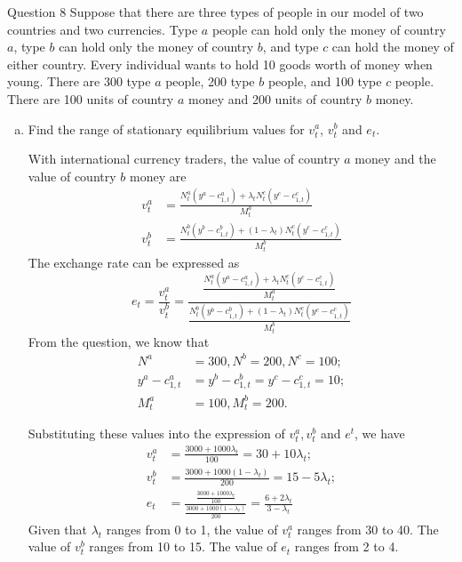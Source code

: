 \documentclass[a4paper]{article}
\newif\IfInSansMode
\numberwithin{equation}{section}
\numberwithin{figure}{section}
\begin{document}
	\begin{questionbox}{Question 8}
		Suppose that there are three types of people in our model of two countries and two currencies. Type \( a \) people can hold only the money of country \( a \), type \( b \) can hold only the money of country \( b \), and type \( c \) can hold the money of either country. Every individual wants to hold 10 goods worth of money when young. There are 300 type \( a \) people, 200 type \( b \) people, and 100 type \( c \) people. There are 100 units of country \( a \) money and 200 units of country \( b \) money.
		\begin{enumerate}[(a)]
			\item Find the range of stationary equilibrium values for \( v_t^a \), \( v_t^b \) and \( e_t \).
			\begin{explanationbox}
				With international currency traders, the value of country \( a \) money and the value of country \( b \) money are
				\begin{align*}
					v_t^a &= \frac{N_t^a(y^a-c_{1,t}^a) + \lambda_t N_t^c (y^c-c_{1,t}^c)}{M_t^a}\\
					v_t^b &= \frac{N_t^b(y^b-c_{1,t}^b) + (1 - \lambda_t) N_t^c (y^c-c_{1,t}^c)}{M_t^b}
				\end{align*}
				The exchange rate can be expressed as
				\[
					e_t = \frac{v_t^a}{v_t^b} = \frac{\frac{N_t^a(y^a-c_{1,t}^a) + \lambda_t N_t^c (y^c-c_{1,t}^c)}{M_t^a}}{\frac{N_t^b(y^b-c_{1,t}^b) + (1 - \lambda_t) N_t^c (y^c-c_{1,t}^c)}{M_t^b}}
				\]
				From the question, we know that
				\begin{align*}
					N^a &= 300, N^b=200, N^c = 100;\\
					y^a-c_{1,t}^a &= y^b-c_{1,t}^b = y^c - c_{1,t}^c = 10;\\
					M_t^a &= 100, M_t^b = 200.
				\end{align*}
			\end{explanationbox}
			\begin{explanationbox}
				Substituting these values into the expression of \( v_t^a, v_t^b \) and \( e^t \), we have
				\begin{align*}
					v_t^a &= \frac{3000+1000\lambda_t}{100} = 30 + 10\lambda_t;\\
					v_t^b &= \frac{3000+1000(1-\lambda_t)}{200} = 15 - 5\lambda_t;\\
					e_t &= \frac{\frac{3000+1000\lambda_t}{100}}{\frac{3000+1000(1-\lambda_t)}{200}} = \frac{6+2\lambda_t}{3-\lambda_t}
				\end{align*}
				Given that \( \lambda_t \) ranges from 0 to 1, the value of \( v_t^a \) ranges from 30 to 40. The value of \( v_t^b \) ranges from 10 to 15. The value of \( e_t \) ranges from 2 to 4.

\end{explanationbox}
\end{enumerate}
\end{questionbox}
\end{document}
